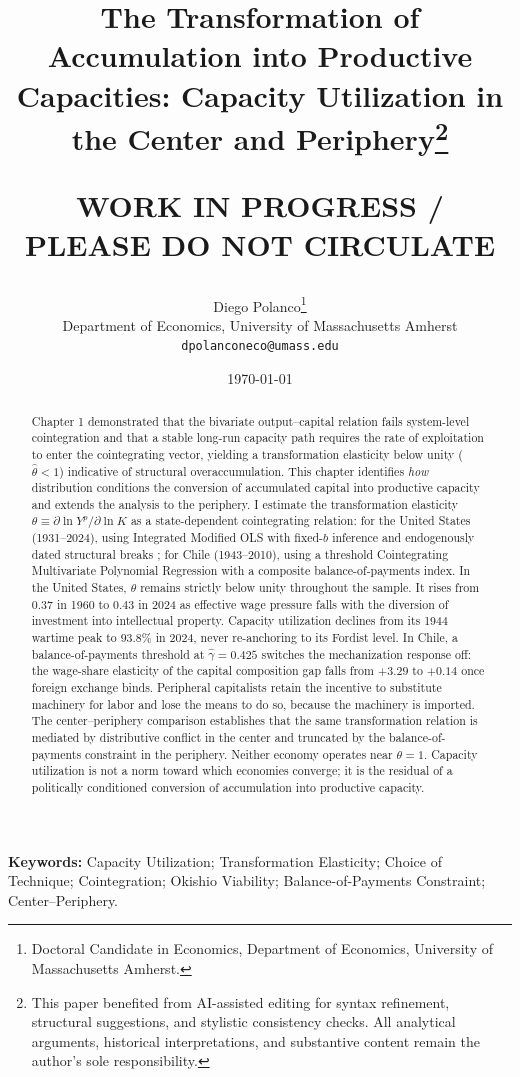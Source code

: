 \documentclass[11pt]{article}
\title{The Transformation of Accumulation into Productive Capacities: Capacity Utilization in the Center and Periphery\thanks{This paper benefited from AI-assisted editing for syntax refinement, structural suggestions, and stylistic consistency checks. All analytical arguments, historical interpretations, and substantive content remain the author's sole responsibility.}\\
\begin{large}
\textbf{WORK IN PROGRESS / PLEASE DO NOT CIRCULATE}     
\end{large}
}
\author{Diego Polanco\thanks{Doctoral Candidate in Economics, Department of Economics, University of Massachusetts Amherst.}\\
Department of Economics, University of Massachusetts Amherst\\
\texttt{dpolanconeco@umass.edu}}
\date{\today}
\begin{document}
\maketitle
\begin{abstract}
	\noindent Chapter 1 demonstrated that the bivariate output--capital relation
	fails system-level cointegration and that a stable long-run capacity path
	requires the rate of exploitation to enter the cointegrating vector, yielding
	a transformation elasticity below unity ($\hat{\theta}<1$) indicative of
	structural overaccumulation. This chapter identifies \emph{how} distribution
	conditions the conversion of accumulated capital into productive capacity and
	extends the analysis to the periphery. I estimate the transformation
	elasticity $\theta \equiv \partial \ln Y^p / \partial \ln K$ as a
	state-dependent cointegrating relation: for the United States
	(1931--2024), using Integrated Modified OLS with fixed-$b$ inference and
	endogenously dated structural breaks \citep{VogelsangWagner2024,BaiPerron2003}; for Chile (1943--2010), using a threshold Cointegrating
	Multivariate Polynomial Regression with a composite balance-of-payments
	index. In the United States, $\theta$ remains strictly below unity throughout the
	sample. It rises from $0.37$ in 1960 to $0.43$ in 2024 as effective wage
	pressure falls with the diversion of investment into intellectual property.
	Capacity utilization declines from its 1944 wartime peak to $93.8\%$ in
	2024, never re-anchoring to its Fordist level. In Chile, a
	balance-of-payments threshold at $\hat{\gamma}=0.425$ switches the
	mechanization response off: the wage-share elasticity of the capital
	composition gap falls from $+3.29$ to $+0.14$ once foreign exchange binds.
	Peripheral capitalists retain the incentive to substitute machinery for labor
	and lose the means to do so, because the machinery is imported. The center--periphery comparison establishes that the same transformation
	relation is mediated by distributive conflict in the center and truncated by
	the balance-of-payments constraint in the periphery. Neither economy operates
	near $\theta=1$. Capacity utilization is not a norm toward which economies
	converge; it is the residual of a politically conditioned conversion of
	accumulation into productive capacity.
\end{abstract}

\vspace{1cm}

\noindent\textbf{Keywords:} Capacity Utilization; Transformation Elasticity; Choice of Technique; Cointegration; Okishio Viability; Balance-of-Payments Constraint; Center--Periphery.
\end{document}
